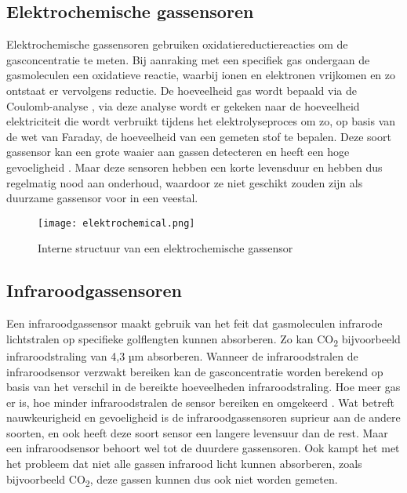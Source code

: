 \subsection{Elektrochemische gassensoren}
\label{subsec:elektrochemische}

Elektrochemische gassensoren gebruiken oxidatiereductiereacties om de gasconcentratie te meten. Bij aanraking met een specifiek gas ondergaan de gasmoleculen een oxidatieve reactie, waarbij ionen en elektronen vrijkomen en zo ontstaat er vervolgens reductie. De hoeveelheid gas wordt bepaald via de Coulomb-analyse
, via deze analyse wordt er gekeken naar de hoeveelheid elektriciteit die wordt verbruikt tijdens het elektrolyseproces om zo, op basis van de wet van Faraday, de hoeveelheid van een gemeten stof te bepalen. Deze soort gassensor kan een grote waaier aan gassen detecteren en heeft een hoge gevoeligheid
. Maar deze sensoren hebben een korte levensduur en hebben dus regelmatig nood aan onderhoud, waardoor ze niet geschikt zouden zijn als duurzame gassensor voor in een veestal.

\begin{figure}[h]
    \texttt{[image: elektrochemical.png]}
    \caption[Structuur elektrochemisch gassensor]{Interne structuur van een elektrochemische gassensor
    }
    \label{fig:elektrochemical}
\end{figure}



\subsection{Infraroodgassensoren}
\label{subsec:infrarood}

Een infraroodgassensor maakt gebruik van het feit dat gasmoleculen infrarode lichtstralen op specifieke golflengten kunnen absorberen. Zo kan CO\textsubscript{2} bijvoorbeeld infraroodstraling van 4,3 µm absorberen. Wanneer de infraroodstralen de infraroodsensor verzwakt bereiken kan de gasconcentratie worden berekend op basis van het verschil in de bereikte hoeveelheden infraroodstraling. Hoe meer gas er is, hoe minder infraroodstralen de sensor bereiken en omgekeerd
. Wat betreft nauwkeurigheid en gevoeligheid is de infraroodgassensoren suprieur aan de andere soorten, en ook heeft deze soort sensor een langere levensuur dan de rest. Maar een infraroodsensor behoort wel tot de duurdere gassensoren. Ook kampt het met het probleem dat niet alle gassen infrarood licht kunnen absorberen, zoals bijvoorbeeld CO\textsubscript{2}, deze gassen kunnen dus ook niet worden gemeten.

